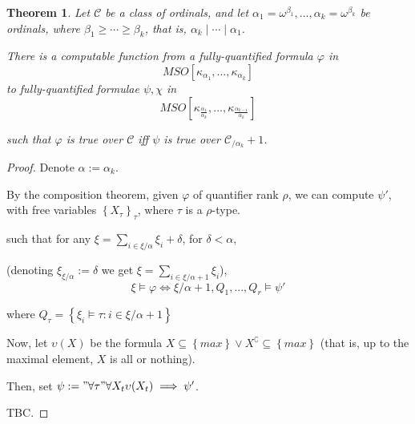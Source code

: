 \documentclass{article}
\newtheorem{theorem}{Theorem}
\newcommand{\brackets}[1]{\left[ {#1} \right]}
\newcommand{\braces}[1]{\left\{ {#1} \right\}}
\newcommand{\setcomp}[2]{\braces{{#1} : {#2}}}
\newcommand{\kk}[1]{{\kappa}_{#1}}
\newcommand{\CC}{\mathcal{C}}
\begin{document}
\begin{theorem}
    Let $\CC$ be a class of ordinals,
    and let $\alpha_1=\omega^{\beta_1}, ..., \alpha_k=\omega^{\beta_k}$ be ordinals,
    where $\beta_1 \ge \cdots \ge \beta_k$, that is, $\alpha_k \mid \cdots \mid \alpha_1$.
    
    There is a computable function from a fully-quantified formula
    $\varphi$ in $$MSO \brackets{\kk{\alpha_1}, ..., \kk{\alpha_k}}$$
    to fully-quantified formulae $\psi, \chi$ in $$MSO \brackets{\kk{\frac{\alpha_1}{\alpha_k}}, ..., \kk{\frac{\alpha_{k-1}}{\alpha_k}}}$$

    such that $\varphi$ is true over $\CC$ iff
    $\psi$ is true over $\CC_{/\alpha_k} + 1$.
\end{theorem}

\begin{proof}
    Denote $\alpha := \alpha_k$.

    By the composition theorem, given $\varphi$ of quantifier rank $\rho$,
    we can compute $\psi'$,
    with free variables $\braces{X_\tau}_\tau$,
    where $\tau$ is a $\rho$-type.

    such that for any $\xi = \sum_{i \in \xi / \alpha} \xi_i + \delta$,
    for $\delta < \alpha$,
    
    (denoting $\xi_{\xi / \alpha} := \delta$ we get $\xi = \sum_{i \in \xi / \alpha + 1} \xi_i$),
    $$\xi \vDash \varphi \iff \xi/\alpha + 1, Q_1, ..., Q_r\vDash \psi'$$

    where $Q_\tau = \setcomp{\xi_i \vDash \tau}{i \in \xi / \alpha + 1}$

    Now, let $\upsilon(X)$ be the formula $X \subseteq \braces{max} \vee X^\complement \subseteq \braces{max}$
    (that is, up to the maximal element, $X$ is all or nothing).

    Then, set $\psi := "\forall \tau" \forall X_t \upsilon(X_t) \implies \psi'$.
    
    TBC.
    
\end{proof}
\end{document}
